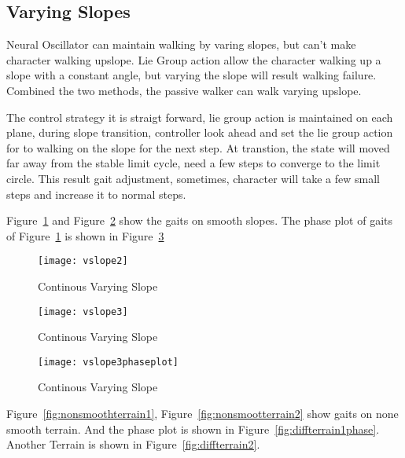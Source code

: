 \subsection{Varying Slopes}
Neural Oscillator can maintain walking by varing slopes, but can't make character walking upslope.
Lie Group action allow the character walking up a slope with a constant angle, but varying the slope will result walking failure.
Combined the two methods, the passive walker can walk varying upslope.


The control strategy it is straigt forward, lie group action is maintained on each plane, during slope transition, controller look ahead and set the lie group action for to walking on the slope for the next step.
At transtion, the state will moved far away from the stable limit cycle, need a few steps to converge to the limit circle.
This result gait adjustment, sometimes, character will take a few small steps and increase it to normal steps.


Figure~\ref{fig:vp1} and Figure~\ref{fig:vp2} show the gaits on smooth slopes.
The phase plot of gaits of Figure~\ref{fig:vp1} is shown in Figure~\ref{fig:vp2phas} 

\begin{figure}[!htbp]
  \begin{center}
      \texttt{[image: vslope2]}
    \caption{Continous Varying Slope}
    \label{fig:vp1}
\end{center}
\end{figure}


\begin{figure}[!htbp]
  \begin{center}
      \texttt{[image: vslope3]}
    \caption{Continous Varying Slope}
    \label{fig:vp2}
\end{center}
\end{figure}


\begin{figure}[!htbp]
  \begin{center}
      \texttt{[image: vslope3phaseplot]}
    \caption{Continous Varying Slope}
    \label{fig:vp2phas}
\end{center}
\end{figure}



Figure~\ref{fig:nonsmoothterrain1}, Figure~\ref{fig:nonsmootterrain2} show gaits on none smooth terrain.
And the phase plot is shown in Figure~\ref{fig:diffterrain1phase}.
Another Terrain is shown in Figure~\ref{fig:diffterrain2}.








